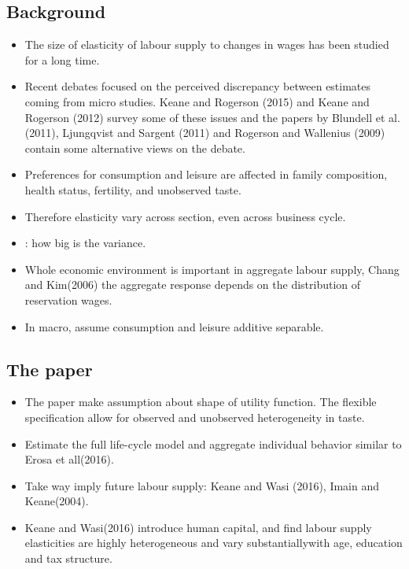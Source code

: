 \subsection{Background}
\begin{itemize}

\item The size of elasticity of labour supply to changes in wages has been studied for a long time.

\item Recent debates focused on the perceived discrepancy between estimates coming from micro studies. Keane and Rogerson (2015) and Keane and Rogerson (2012) survey some of these issues and the papers by Blundell et al. (2011), Ljungqvist and Sargent (2011) and Rogerson and Wallenius (2009) contain some alternative views on the debate.

\item Preferences for consumption and leisure are affected in family composition, health status, fertility, and unobserved taste.

\item Therefore elasticity vary across section, even across business cycle.

\item {}: how big is the variance.

\item Whole economic environment is important in aggregate labour supply, Chang and Kim(2006) the aggregate response depends on the distribution of reservation wages.

\item In macro, assume consumption and leisure additive separable.
\end{itemize}
\subsection{The paper}
\begin{itemize}
    \item The paper make assumption about shape of utility function. The flexible specification allow for observed and unobserved heterogeneity in taste.
    \item Estimate the full life-cycle  model and aggregate individual behavior similar to Erosa et all(2016).
    \item Take way imply future labour supply: Keane and Wasi (2016), Imain and Keane(2004).
    \item Keane and Wasi(2016) introduce human capital, and find labour supply elasticities are highly heterogeneous and vary substantiallywith age, education and tax structure.
\end{itemize}

